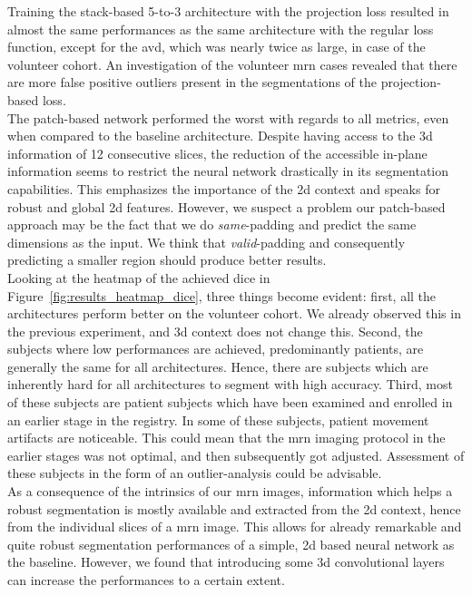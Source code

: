 Training the stack-based 5-to-3 architecture with the projection loss resulted in almost the same performances as the same architecture with the regular loss function, except for the \acrlong{avd}, which was nearly twice as large, in case of the volunteer cohort. An investigation of the volunteer \gls{mrn} cases revealed that there are more false positive outliers present in the segmentations of the projection-based loss.\\
The patch-based network performed the worst with regards to all metrics, even when compared to the baseline architecture. Despite having access to the \gls{3d} information of 12 consecutive slices, the reduction of the accessible in-plane information seems to restrict the neural network drastically in its segmentation capabilities. This emphasizes the importance of the \gls{2d} context and speaks for robust and global \gls{2d} features. However, we suspect a problem our patch-based approach may be the fact that we do \textit{same}-padding and predict the same dimensions as the input. We think that \textit{valid}-padding and consequently predicting a smaller region should produce better results.\\
Looking at the heatmap of the achieved \gls{dice} in Figure~\ref{fig:results_heatmap_dice}, three things become evident: first, all the architectures perform better on the volunteer cohort. We already observed this in the previous experiment, and \gls{3d} context does not change this. Second, the subjects where low performances are achieved, predominantly patients, are generally the same for all architectures. Hence, there are subjects which are inherently hard for all architectures to segment with high accuracy. Third, most of these subjects are patient subjects which have been examined and enrolled in an earlier stage in the registry. In some of these subjects, patient movement artifacts are noticeable. This could mean that the \gls{mrn} imaging protocol in the earlier stages was not optimal, and then subsequently got adjusted. Assessment of these subjects in the form of an outlier-analysis could be advisable.\\
As a consequence of the intrinsics of our \gls{mrn} images, information which helps a robust segmentation is mostly available and extracted from the \gls{2d} context, hence from the individual slices of a \gls{mrn} image. This allows for already remarkable and quite robust segmentation performances of a simple, \gls{2d} based neural network as the baseline. However, we found that introducing some \gls{3d} convolutional layers can increase the performances to a certain extent. \\

